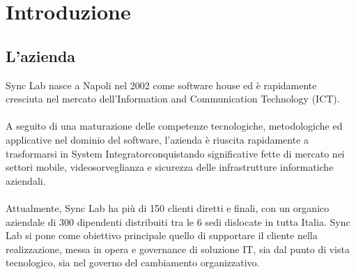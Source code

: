 
\chapter{Introduzione}
\label{cap:introduzione}





\section{L'azienda}

Sync Lab nasce a Napoli nel 2002 come software house ed è rapidamente cresciuta nel
mercato dell’Information and Communication Technology (ICT). 
\\\\
A seguito di una
maturazione delle competenze tecnologiche, metodologiche ed applicative nel dominio
del software, l’azienda è riuscita rapidamente a trasformarsi in \gls{System Integrator}\glsfirstoccur conquistando 
significative fette di mercato nei settori mobile, videosorveglianza e sicurezza
delle infrastrutture informatiche aziendali. 
\\\\
Attualmente, Sync Lab ha più di 150 clienti
diretti e finali, con un organico aziendale di 300 dipendenti distribuiti tra le 6 sedi
dislocate in tutta Italia.
Sync Lab si pone come obiettivo principale quello di supportare il cliente nella realizzazione, 
messa in opera e governance di soluzione \gls{IT}\glsfirstoccur, sia dal punto di vista tecnologico,
sia nel governo del cambiamento organizzativo.

